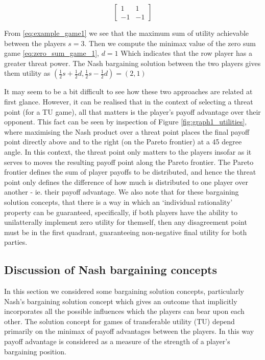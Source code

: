 \begin{equation}\label{eq:zero_sum_game_1} \begin{bmatrix}1 & 1\\ -1 & -1\end{bmatrix} \end{equation}

\begin{solution}[TU approach]
From \eqref{eq:example_game1} we see that the maximum sum of utility achievable between the players $s=3$. Then we compute the minimax value of the zero sum game \eqref{eq:zero_sum_game_1}, $d=1$ Which indicates that the row player has a greater threat power.
The Nash bargaining solution between the two players gives them utility as $(\frac{1}{2}s+\frac{1}{2}d,\frac{1}{2}s-\frac{1}{2}d) = (2,1)$
\end{solution}

It may seem to be a bit difficult to see how these two approaches are related at first glance.
However, it can be realised that in the context of selecting a threat point (for a TU game), all that matters is the player's payoff advantage over their opponent.
This fact can be seen by inspection of Figure \ref{fig:graph1_utilities}, where maximising the Nash product over a threat point places the final payoff point directly above and to the right (on the Pareto frontier) at a 45 degree angle.
In this context, the threat point only matters to the players insofar as it serves to moves the resulting payoff point along the Pareto frontier.
The Pareto frontier defines the sum of player payoffs to be distributed, and hence the threat point only defines the difference of how much is distributed to one player over another - ie. their payoff advantage. We also note that for these bargaining solution concepts, that there is a way in which an `individual rationality' property can be guaranteed, specifically, if both players have the ability to unilatterally implement zero utility for themself, then any disagreement point must be in the first quadrant, guaranteeing non-negative final utility for both parties.

\subsection{Discussion of Nash bargaining concepts}

In this section we considered some bargaining solution concepts, particularly Nash's bargaining solution concept which gives an outcome that implicitly incorporates all the possible influences which the players can bear upon each other.
The solution concept for games of transferable utility (TU) depend primarily on the minimax of payoff advantages between the players.
In this way payoff advantage is considered as a measure of the strength of a player's bargaining position.

